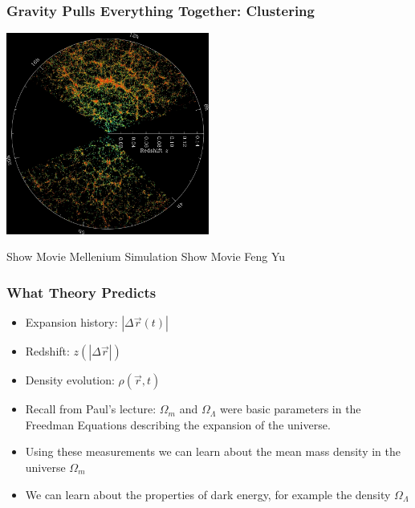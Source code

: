 \documentclass{beamer}
\begin{document}
\frame
{

    \frametitle{Gravity Pulls Everything Together: Clustering}



    \begin{center}
        \includegraphics[width=0.5\textwidth]{orangepie.jpg}
    \end{center}

    Show Movie Mellenium Simulation
    Show Movie Feng Yu


}


\frame
{

    \frametitle{What Theory Predicts}


    \begin{itemize}

            

        \item Expansion history: {\color{gold} $|\Delta \vec{r} (t)|$ }


        \item Redshift: {\color{gold} $z(|\Delta \vec{r}|)$}


        \item Density evolution: {\color{gold} $\rho(\vec{r},t)$}

        \item Recall from Paul's lecture: {\color{gold} $\Omega_m$} and
            {\color{gold} $\Omega_\Lambda$} were basic parameters in the
            Freedman Equations describing the expansion of the universe.


        \item Using these measurements we can learn about the mean mass density in
            the universe {\color{gold} $\Omega_m$}
            
        \item We can learn about the properties of dark energy, for example
            the density {\color{gold} $\Omega_\Lambda$}



    \end{itemize}

}
\end{document}
